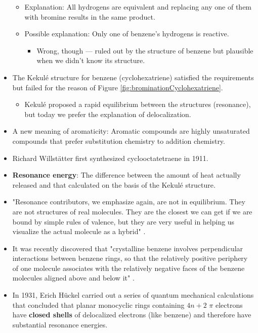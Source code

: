 \documentclass[../notes.tex]{subfiles}
\begin{document}
\begin{itemize}
    \begin{itemize}
        \item Explanation: All hydrogens are equivalent and replacing any one of them with bromine results in the same product.
        \item Possible explanation: Only one of benzene's hydrogens is reactive.
        \begin{itemize}
            \item Wrong, though --- ruled out by the structure of benzene but plausible when we didn't know its structure.
        \end{itemize}
    \end{itemize}
    \item The Kekul\'{e} structure for benzene (cyclohexatriene) satisfied the requirements but failed for the reason of Figure \ref{fig:brominationCyclohexatriene}.
    \begin{itemize}
        \item Kekul\'{e} proposed a rapid equilibrium between the structures (resonance), but today we prefer the explanation of delocalization.
    \end{itemize}
    \item A new meaning of aromaticity: Aromatic compounds are highly unsaturated compounds that prefer substitution chemistry to addition chemistry.
    \item Richard Willst\"{a}tter first synthesized cyclooctatetraene in 1911.
    \item \textbf{Resonance energy}: The difference between the amount of heat actually released and that calculated on the basis of the Kekul\'{e} structure.
    \item "Resonance contributors, we emphasize again, are not in equilibrium. They are not structures of real molecules. They are the closest we can get if we are bound by simple rules of valence, but they are very useful in helping us visualize the actual molecule as a hybrid" \parencite[625]{bib:SolomonsEtAl}.
    \item It was recently discovered that "crystalline benzene involves perpendicular interactions between benzene rings, so that the relatively positive periphery of one molecule associates with the relatively negative faces of the benzene molecules aligned above and below it" \parencite[627]{bib:SolomonsEtAl}.
    \item In 1931, Erich H\"{u}ckel carried out a series of quantum mechanical calculations that concluded that planar monocyclic rings containing $4n+2$ $\pi$ electrons have \textbf{closed shells} of delocalized electrons (like benzene) and therefore have substantial resonance energies.

\end{itemize}
\end{document}
